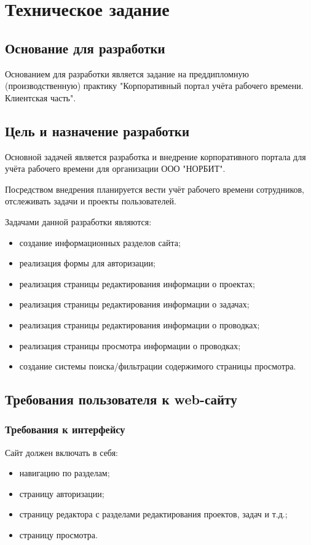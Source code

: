 \section{Техническое задание}
\subsection{Основание для разработки}

Основанием для разработки является задание на преддипломную (производственную) практику "Корпоративный портал учёта рабочего времени. Клиентская часть".

\subsection{Цель и назначение разработки}

Основной задачей является разработка и внедрение корпоративного портала для учёта рабочего времени для организации ООО "НОРБИТ".

Посредством внедрения планируется вести учёт рабочего времени сотрудников, отслеживать задачи и проекты пользователей.

Задачами данной разработки являются:
\begin{itemize}
\item создание информационных разделов сайта;
\item реализация формы для авторизации;
\item реализация страницы редактирования информации о проектах;
\item реализация страницы редактирования информации о задачах;
\item реализация страницы редактирования информации о проводках;
\item реализация страницы просмотра информации о проводках;
\item создание системы поиска/фильтрации содержимого страницы просмотра.
\end{itemize}

\subsection{Требования пользователя к web-сайту}

\subsubsection{Требования к интерфейсу}
Сайт должен включать в себя:
\begin{itemize}
    \item навигацию по разделам;
    \item страницу авторизации;
    \item страницу редактора с разделами редактирования проектов, задач и т.д.;
	\item страницу просмотра.
\end{itemize}

